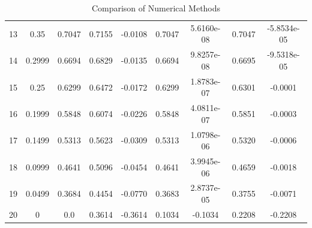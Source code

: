 \documentclass[conference,onecolumn]{IEEEtran}
\begin{document}
\begin{enumerate}
\begin{table}[H]
\begin{tabular}{c c c | c c | c c | c c}
                        13                          & 0.35                   & 0.7047                                 & 0.7155                                       & -0.0108                                   & 0.7047                                       & 5.6160e-08     & 0.7047 & -5.8534e-05    \\
                        14                          & 0.2999                 & 0.6694                                 & 0.6829                                       & -0.0135                                   & 0.6694                                       & 9.8257e-08     & 0.6695 & -9.5318e-05    \\
                        15                          & 0.25                   & 0.6299                                 & 0.6472                                       & -0.0172                                   & 0.6299                                       & 1.8783e-07     & 0.6301 & -0.0001        \\
                        16                          & 0.1999                 & 0.5848                                 & 0.6074                                       & -0.0226                                   & 0.5848                                       & 4.0811e-07     & 0.5851 & -0.0003        \\
                        17                          & 0.1499                 & 0.5313                                 & 0.5623                                       & -0.0309                                   & 0.5313                                       & 1.0798e-06     & 0.5320 & -0.0006        \\
                        18                          & 0.0999                 & 0.4641                                 & 0.5096                                       & -0.0454                                   & 0.4641                                       & 3.9945e-06     & 0.4659 & -0.0018        \\
                        19                          & 0.0499                 & 0.3684                                 & 0.4454                                       & -0.0770                                   & 0.3683                                       & 2.8737e-05     & 0.3755 & -0.0071        \\
                        20                          & 0                      & 0.0                                    & 0.3614                                       & -0.3614                                   & 0.1034                                       & -0.1034        & 0.2208 & -0.2208        \\
                        \bottomrule
                  \end{tabular}
                  \caption{Comparison of Numerical Methods}
                  \label{tab:comparison}
            \end{table}


\end{enumerate}
\end{document}
